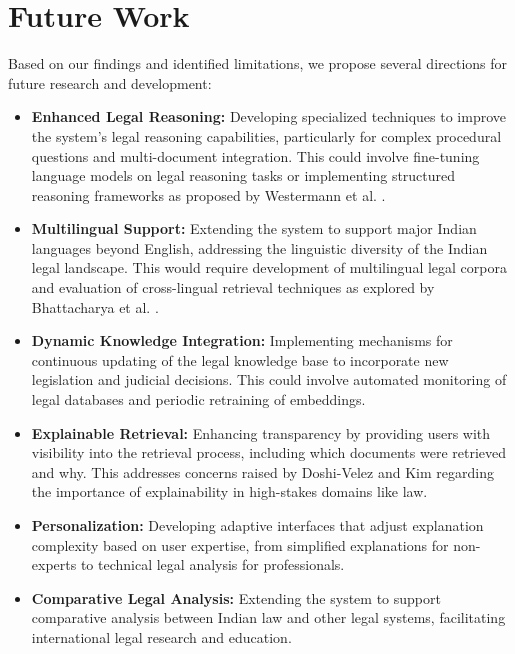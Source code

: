\documentclass[conference]{IEEEtran}
\begin{document}
\section{Future Work}

Based on our findings and identified limitations, we propose several directions for future research and development:

\begin{itemize}
    \item \textbf{Enhanced Legal Reasoning:} Developing specialized techniques to improve the system's legal reasoning capabilities, particularly for complex procedural questions and multi-document integration. This could involve fine-tuning language models on legal reasoning tasks or implementing structured reasoning frameworks as proposed by Westermann et al. \cite{westermann2023}.
    
    \item \textbf{Multilingual Support:} Extending the system to support major Indian languages beyond English, addressing the linguistic diversity of the Indian legal landscape. This would require development of multilingual legal corpora and evaluation of cross-lingual retrieval techniques as explored by Bhattacharya et al. \cite{bhattacharya2021}.
    
    \item \textbf{Dynamic Knowledge Integration:} Implementing mechanisms for continuous updating of the legal knowledge base to incorporate new legislation and judicial decisions. This could involve automated monitoring of legal databases and periodic retraining of embeddings.
    
    \item \textbf{Explainable Retrieval:} Enhancing transparency by providing users with visibility into the retrieval process, including which documents were retrieved and why. This addresses concerns raised by Doshi-Velez and Kim \cite{doshi2017} regarding the importance of explainability in high-stakes domains like law.
    
    \item \textbf{Personalization:} Developing adaptive interfaces that adjust explanation complexity based on user expertise, from simplified explanations for non-experts to technical legal analysis for professionals.
    
    \item \textbf{Comparative Legal Analysis:} Extending the system to support comparative analysis between Indian law and other legal systems, facilitating international legal research and education.
\end{itemize}
\end{document}
